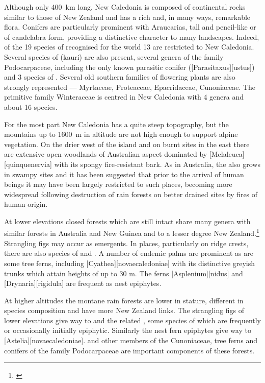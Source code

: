 Although only \SI{400}{\kilo\metre} long, New Caledonia is composed of continental rocks similar to those of New Zealand and has a rich and, in many ways, remarkable flora.
Conifers are particularly prominent with Araucarias, tall and pencil-like or of candelabra form, providing a distinctive character to many landscapes.
Indeed, of the 19 species of  recognised for the world 13 are restricted to New Caledonia.
Several species of  (kauri) are also present, several genera of the family Podocarpaceae, including the only known parasitic conifer ([Parasitaxus][ustus]) and 3 species of .
Several old southern families of flowering plants are also strongly represented --- Myrtaceae, Proteaceae, Epacridaceae, Cunoniaceae.
The primitive family Winteraceae is centred in New Caledonia with 4 genera and about 16 species.

For the most part New Caledonia has a quite steep topography, but the mountains up to \SI{1600}{\metre} in altitude are not high enough to support alpine vegetation.
On the drier west of the island and on burnt sites in the east there are extensive open woodlands of Australian aspect dominated by [Melaleuca][quinquenervia] with its spongy fire-resistant bark.
As in Australia, the  also grows in swampy sites and it has been suggested that prior to the arrival of human beings it may have been largely restricted to such places, becoming more widespread following destruction of rain forests on better drained sites by fires of human origin.

At lower elevations closed forests which are still intact share many genera with similar forests in Australia and New Guinea and to a lesser degree New Zealand.\footnote{\cite{morat1986floristic}}
Strangling figs may occur as emergents.
In places, particularly on ridge crests, there are also species of  and .
A number of endemic palms are prominent as are some tree ferns, including [Cyathea][novaecaledoniae] with its distinctive greyish trunks which attain heights of up to 30 m.
The ferns [Asplenium][nidus] and [Drynaria][rigidula] are frequent as nest epiphytes.

At higher altitudes the montane rain forests are lower in stature, different in species composition and have more New Zealand links.
The strangling figs of lower elevations give way to  and the related , some species of which are frequently or occasionally initially epiphytic.
Similarly the nest fern epiphytes give way to [Astelia][novaecaledoniae].  and other members of the Cunoniaceae, tree ferns and conifers of the family Podocarpaceae are important components of these forests.

